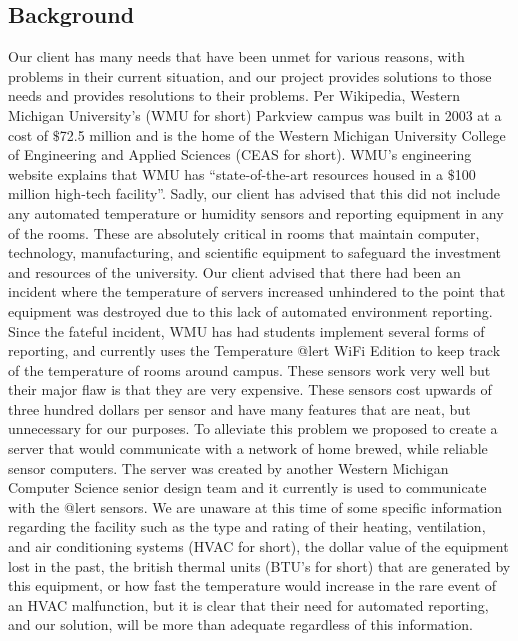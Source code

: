 \documentclass{report}
\begin{document}
\subsection*{Background}
Our client has many needs that have been unmet for various reasons, with problems in their current situation, and our project provides solutions to those needs and provides resolutions to their problems.
\newline
\indent
Per Wikipedia, Western Michigan University's (WMU for short) Parkview campus was built in 2003 at a cost of $\$$72.5 million and is the home of the Western Michigan University College of Engineering and Applied Sciences (CEAS for short). 
 WMU’s engineering website explains that WMU has “state-of-the-art resources housed in a $\$$100 million high-tech facility”. 
Sadly, our client has advised that this did not include any automated temperature or humidity sensors and reporting equipment in any of the rooms. 
 These are absolutely critical in rooms that maintain computer, technology, manufacturing, and scientific equipment to safeguard the investment and resources of the university.
 Our client advised that there had been an incident where the temperature of servers increased unhindered to the point that equipment was destroyed due to this lack of automated environment reporting.
Since the fateful incident, WMU has had students implement several forms of reporting, and currently uses the Temperature @lert WiFi Edition to keep track of the temperature of rooms around campus. 
These sensors work very well but their major flaw is that they are very expensive. These sensors cost upwards of three hundred dollars per sensor and have many features that are neat, but unnecessary for our purposes. 
To alleviate this problem we proposed to create a server that would communicate with a network of home brewed, while reliable sensor computers. 
The server was created by another Western Michigan Computer Science senior design team and it currently is used to communicate with the @lert sensors.
\newline
\indent  
We are unaware at this time of some specific information regarding the facility such as the type and rating of their heating, ventilation, and air conditioning systems (HVAC for short), the dollar value of the equipment lost in the past, the british thermal units (BTU’s for short) that are generated by this equipment, or how fast the temperature would increase in the rare event of an HVAC malfunction, but it is clear that their need for automated reporting, and our solution, will be more than adequate regardless of this information. 
\end{document}
